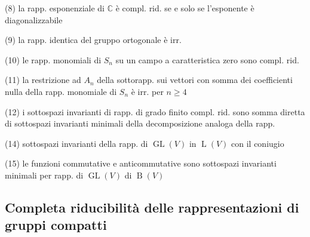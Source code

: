 \documentclass[a4paper,twocolumn,twoside]{article}
\newcommand*\itemz[1]{\item[#1.]}
\newcommand*\itemZ[1]{\itemz{\xmakefirstuc{#1}}}
\newcommand*\pag{\null\hspace*{0pt}\dotfill}
\newcommand*\e{\itemZ e}
\newcommand*\C{\mathbb C}
\DeclareMathOperator\GL{GL}
\renewcommand*\L{\operatorname{L}}
\DeclareMathOperator\B{B}
\begin{document}
\begin{description}
\begin{inparaenum}[(a)]
		\end{inparaenum}
		\pag 21
	\e (8) la rapp. esponenziale di $\C$ è compl. rid. se e solo se l'esponente è diagonalizzabile \pag 21
	\e (9) la rapp. identica del gruppo ortogonale è irr. \pag 21
	\e (10) le rapp. monomiali di $S_n$ su un campo a caratteristica zero sono compl. rid. \pag 21
	\e (11) la restrizione ad $A_n$ della sottorapp. sui vettori con somma dei coefficienti nulla della rapp. monomiale di $S_n$ è irr. per $n\ge4$ \pag 21
	\e (12) i sottospazi invarianti di rapp. di grado finito compl. rid. sono somma diretta di sottospazi invarianti minimali della decomposizione analoga della rapp. \pag 21
	\e (14) sottospazi invarianti della rapp. di $\GL(V)$ in $\L(V)$ con il coniugio \pag 22
	\e (15) le funzioni commutative e anticommutative sono sottospazi invarianti minimali per rapp. di $\GL(V)$ di $\B(V)$ \pag 22
\end{description}

\subsection{Completa riducibilità delle rappresentazioni di gruppi compatti}
\end{document}
